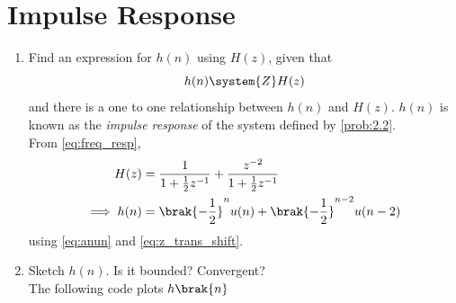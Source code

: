 \documentclass[journal,12pt,twocolumn]{IEEEtran}
\theoremstyle{remark}
\begin{document}
																																																						   \section{Impulse Response}
																																																						   \begin{enumerate}[label=\thesection.\arabic*]
																																																						   \item \label{prob:impulse_resp}
																																																						   Find an expression for $h(n)$ using $H(z)$, given that 
																																																						   \begin{equation}
																																																						   \label{eq:impulse_resp}
																																																						   h(n) \system{Z} H(z)
																																																						   \end{equation}
																																																						   and there is a one to one relationship between $h(n)$ and $H(z)$. $h(n)$ is known as the {\em impulse response} of the
																																																						   system defined by \eqref{prob:2.2}.
																																																						   \\
																																																						   \solution From \eqref{eq:freq_resp},
																																																						   \begin{align}
																																																						   H(z) &= \frac{1}{1 + \frac{1}{2}z^{-1}} + \frac{ z^{-2}}{1 + \frac{1}{2}z^{-1}}
																																																						   \\
																																																						   \implies h(n) &= \brak{-\frac{1}{2}}^{n}u(n) + \brak{-\frac{1}{2}}^{n-2}u(n-2)
																																																						   \end{align}
																																																						   using \eqref{eq:anun} and \eqref{eq:z_trans_shift}.
																																																						   \item Sketch $h(n)$. Is it bounded? Convergent? 
																																																						   \\
																																																						   \solution The following code plots $h\brak{n}$ 

\end{enumerate}
\end{document}
